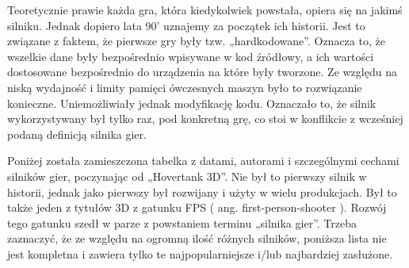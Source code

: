 \documentclass[brudnopis]{xmgr}
\begin{document}
Teoretycznie prawie każda gra, która kiedykolwiek powstała, opiera się na jakimś silniku. Jednak dopiero lata 90' uznajemy za początek ich historii. Jest to związane z faktem, że pierwsze gry były tzw. „hardkodowane”. Oznacza to, że wszelkie dane były bezpośrednio wpisywane w kod źródłowy, a ich wartości dostosowane bezpośrednio do urządzenia na które były tworzone. Ze względu na niską wydajność i limity pamięci ówczesnych maszyn było to rozwiązanie konieczne. Uniemożliwiały jednak modyfikację kodu. Oznaczało to, że silnik wykorzystywany był tylko raz, pod konkretną grę, co stoi w konflikcie z wcześniej podaną definicją silnika gier.

Poniżej została zamieszczona tabelka z datami, autorami i szczególnymi cechami silników gier, poczynając od „Hovertank 3D”. Nie był to pierwszy silnik w historii, jednak jako pierwszy był rozwijany i użyty w wielu produkcjach. Był to także jeden z tytułów 3D z gatunku FPS ( ang. first-person-shooter ). Rozwój tego gatunku szedł w parze z powstaniem terminu „silnika gier”. Trzeba zaznaczyć, że ze względu na ogromną ilość różnych silników, poniższa lista nie jest kompletna i zawiera tylko te najpopularniejsze i/lub najbardziej zasłużone.
\end{document}
